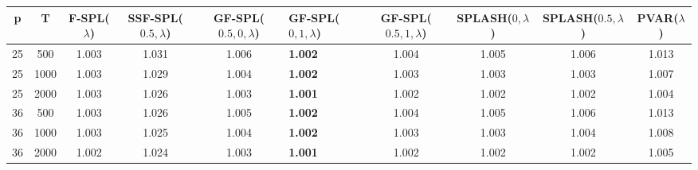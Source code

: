 \begin{tabular}{ccccclcccc}
\hline
  p  &  T   &  F-SPL($\lambda$)  &  SSF-SPL($0.5, \lambda$)  &  GF-SPL($0.5, 0, \lambda$)  & GF-SPL($0, 1, \lambda$)   &  GF-SPL($0.5, 1, \lambda$)  &  SPLASH($0, \lambda$)  &  SPLASH($0.5, \lambda$)  &  PVAR($\lambda$)  \\
\hline
 25  & 500  &       1.003        &           1.031           &            1.006            & \textbf{1.002}            &            1.004            &         1.005          &          1.006           &       1.013       \\
 25  & 1000 &       1.003        &           1.029           &            1.004            & \textbf{1.002}            &            1.003            &         1.003          &          1.003           &       1.007       \\
 25  & 2000 &       1.003        &           1.026           &            1.003            & \textbf{1.001}            &            1.002            &         1.002          &          1.002           &       1.004       \\
 36  & 500  &       1.003        &           1.026           &            1.005            & \textbf{1.002}            &            1.004            &         1.005          &          1.006           &       1.013       \\
 36  & 1000 &       1.003        &           1.025           &            1.004            & \textbf{1.002}            &            1.003            &         1.003          &          1.004           &       1.008       \\
 36  & 2000 &       1.002        &           1.024           &            1.003            & \textbf{1.001}            &            1.002            &         1.002          &          1.002           &       1.005       \\
\hline
\end{tabular}